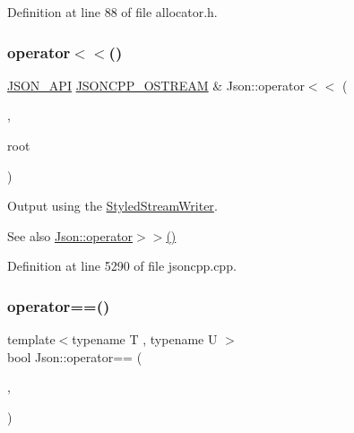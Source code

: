 Definition at line 88 of file allocator.\+h.

\hypertarget{namespace_json_a845a15902e500af8eee19e729a17b863}{}\label{namespace_json_a845a15902e500af8eee19e729a17b863} 
\subsubsection{\texorpdfstring{operator$<$$<$()}{operator<<()}}
{\footnotesize\ttfamily \hyperlink{config_8h_a1d61ffde86ce1a18fd83194ff0d9a206}{J\+S\+O\+N\+\_\+\+A\+PI} \hyperlink{config_8h_a37a25be5fca174927780caeb280094ce}{J\+S\+O\+N\+C\+P\+P\+\_\+\+O\+S\+T\+R\+E\+AM} \& Json\+::operator$<$$<$ (\begin{DoxyParamCaption}\item[{\hyperlink{config_8h_a37a25be5fca174927780caeb280094ce}{J\+S\+O\+N\+C\+P\+P\+\_\+\+O\+S\+T\+R\+E\+AM} \&}]{,  }\item[{const \hyperlink{class_json_1_1_value}{Value} \&}]{root }\end{DoxyParamCaption})}



Output using the \hyperlink{class_json_1_1_styled_stream_writer}{Styled\+Stream\+Writer}. 

\begin{DoxySeeAlso}{See also}
\hyperlink{namespace_json_a01f08004efa8a401e01ebd17be77dc71}{Json\+::operator$>$$>$()} 
\end{DoxySeeAlso}


Definition at line 5290 of file jsoncpp.\+cpp.

\hypertarget{namespace_json_a85a761cd8643a538387c0fe37bb937e8}{}\label{namespace_json_a85a761cd8643a538387c0fe37bb937e8} 
\subsubsection{\texorpdfstring{operator==()}{operator==()}}
{\footnotesize\ttfamily template$<$typename T , typename U $>$ \\
bool Json\+::operator== (\begin{DoxyParamCaption}\item[{const \hyperlink{class_json_1_1_secure_allocator}{Secure\+Allocator}$<$ T $>$ \&}]{,  }\item[{const \hyperlink{class_json_1_1_secure_allocator}{Secure\+Allocator}$<$ U $>$ \&}]{ }\end{DoxyParamCaption})}



